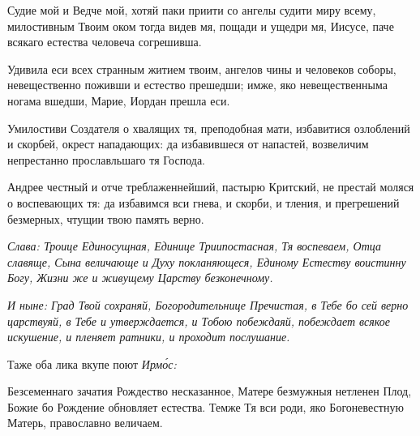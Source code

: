 Судие мой и Ведче мой, хотяй паки приити со ангелы судити миру всему, милостивным Твоим оком тогда видев мя, пощади и ущедри мя, Иисусе, паче всякаго естества человеча согрешивша.


Удивила еси всех странным житием твоим, ангелов чины и человеков соборы, невещественно поживши и естество прешедши; имже, яко невещественныма ногама вшедши, Марие, Иордан прешла еси.


Умилостиви Создателя о хвалящих тя, преподобная мати, избавитися озлоблений и скорбей, окрест нападающих: да избавившеся от напастей, возвеличим непрестанно прославльшаго тя Господа.


Андрее честный и отче треблаженнейший, пастырю Критский, не престай моляся о воспевающих тя: да избавимся вси гнева, и скорби, и тления, и прегрешений безмерных, чтущии твою память верно.

\itshape Слава\normalfont{}: Троице Единосущная, Единице Триипостасная, Тя воспеваем, Отца славяще, Сына величающе и Духу покланяющеся, Единому Естеству воистинну Богу, Жизни же и живущему Царству безконечному.

\itshape И ныне\normalfont{}: Град Твой сохраняй, Богородительнице Пречистая, в Тебе бо сей верно царствуяй, в Тебе и утверждается, и Тобою побеждаяй, побеждает всякое искушение, и пленяет ратники, и проходит послушание.

Таже оба лика вкупе поют \itshape Ирм\'{о}с\normalfont{}:

Безсеменнаго зачатия Рождество несказанное, Матере безмужныя нетленен Плод, Божие бо Рождение обновляет естества. Темже Тя вси роди, яко Богоневестную Матерь, православно величаем.\mychapterending
